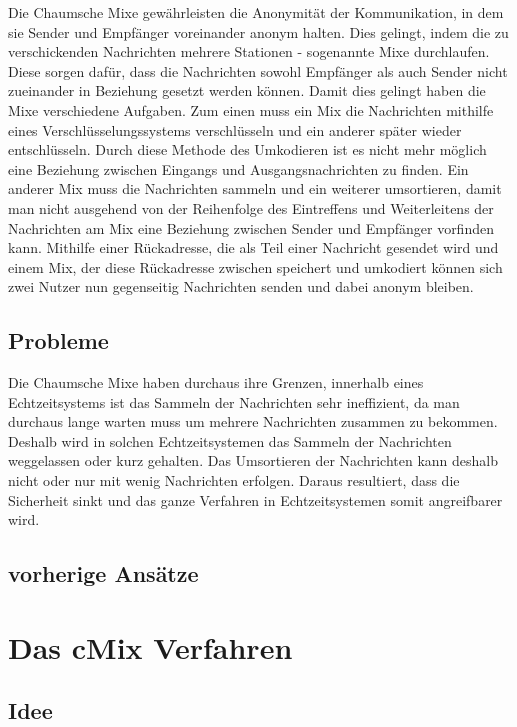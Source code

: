 \documentclass[
    fontsize=12pt,
    headings=small,
    parskip=half,           %
    bibliography=totoc,
    numbers=noenddot,       %
    open=any,               %
    ]{scrreprt}
\begin{document}
Die Chaumsche Mixe gewährleisten die Anonymität der
Kommunikation, in dem sie Sender und Empfänger voreinander anonym halten. Dies
gelingt, indem die zu verschickenden Nachrichten mehrere Stationen - sogenannte
Mixe durchlaufen. Diese sorgen dafür, dass die Nachrichten sowohl Empfänger als
auch Sender nicht zueinander in Beziehung gesetzt werden können. Damit dies
gelingt haben die Mixe verschiedene Aufgaben. 
Zum einen muss ein Mix die
Nachrichten mithilfe eines Verschlüsselungssystems verschlüsseln und ein anderer
später wieder entschlüsseln. Durch diese Methode des Umkodieren ist es nicht mehr
möglich eine Beziehung zwischen Eingangs und Ausgangsnachrichten zu finden. Ein
anderer Mix muss die Nachrichten sammeln und ein weiterer umsortieren, damit
man nicht ausgehend von der Reihenfolge des Eintreffens und Weiterleitens der
Nachrichten am Mix eine Beziehung zwischen Sender und Empfänger vorfinden
kann. Mithilfe einer Rückadresse, die als Teil einer Nachricht gesendet wird und
einem Mix, der diese Rückadresse zwischen speichert und umkodiert können sich
zwei Nutzer nun gegenseitig Nachrichten senden und dabei anonym bleiben.\cite{Chaum:1981:UEM:358549.358563} \cite{sampigethaya2006survey}

\section{Probleme}

Die Chaumsche Mixe haben durchaus ihre Grenzen, innerhalb eines Echtzeitsystems
ist das Sammeln der Nachrichten sehr ineffizient, da man durchaus lange warten
muss um mehrere Nachrichten zusammen zu bekommen. Deshalb wird in solchen
Echtzeitsystemen das Sammeln der Nachrichten weggelassen oder kurz gehalten.
Das Umsortieren der Nachrichten kann deshalb nicht oder nur mit wenig Nachrichten
erfolgen. Daraus resultiert, dass die Sicherheit sinkt und das ganze Verfahren in
Echtzeitsystemen somit angreifbarer wird.\cite{Chaum:1981:UEM:358549.358563} \cite{sampigethaya2006survey}

\section{vorherige Ansätze}

\chapter{Das cMix Verfahren}

\section{Idee}
\end{document}
